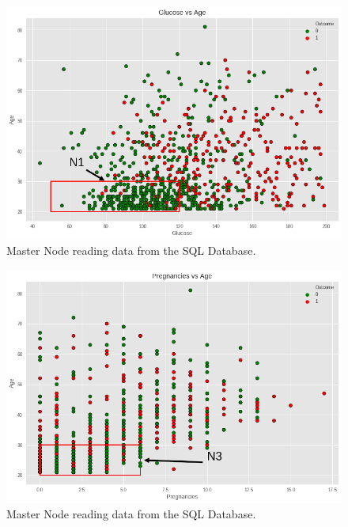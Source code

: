 \documentclass[12pt]{article}
\begin{document}
\begin{figure}[ht]
\centering
\includegraphics[width=1\textwidth]{download(1).png}
\caption{Master Node reading data from the SQL Database.}
\end{figure}

\begin{figure}[ht]
\centering
\includegraphics[width=1\textwidth]{download(2).png}
\caption{Master Node reading data from the SQL Database.}
\end{figure}
\end{document}
